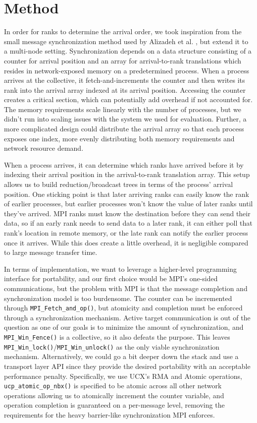 \section{Method}
In order for ranks to determine the arrival order, we took inspiration from the small message synchronization method used by Alizadeh et al. \cite{Alizadeh2022PAPCollDL}, but extend it to a multi-node setting.
Synchronization depends on a data structure consisting of a counter for arrival position and an array for arrival-to-rank translations which resides in network-exposed memory on a predetermined process.
When a process arrives at the collective, it fetch-and-increments the counter and then writes its rank into the arrival array indexed at its arrival position.
Accessing the counter creates a critical section, which can potentially add overhead if not accounted for.
The memory requirements scale linearly with the number of processes, but we didn't run into scaling issues with the system we used for evaluation.
Further, a more complicated design could distribute the arrival array so that each process exposes one index, more evenly distributing both memory requirements and network resource demand.

When a process arrives, it can determine which ranks have arrived before it by indexing their arrival position in the arrival-to-rank translation array.
This setup allows us to build reduction/broadcast trees in terms of the process' arrival position.
One sticking point is that later arriving ranks can easily know the rank of earlier processes, but earlier processes won't know the value of later ranks until they've arrived.
MPI ranks must know the destination before they can send their data, so if an early rank needs to send data to a later rank, it can either poll that rank's location in remote memory, or the late rank can notify the earlier process once it arrives.
While this does create a little overhead, it is negligible compared to large message transfer time.

In terms of implementation, we want to leverage a higher-level programming interface for portability, and our first choice would be MPI's one-sided communications, but the problem with MPI is that the message completion and synchronization model is too burdensome. 
The counter can be incremented through \texttt{MPI\_Fetch\_and\_op()}, but atomicity and completion must be enforced through a synchronization mechanism. 
Active target communication is out of the question as one of our goals is to minimize the amount of synchronization, and \texttt{MPI\_Win\_Fence()} is a collective, so it also defeats the purpose.
This leaves \texttt{MPI\_Win\_lock()}/\texttt{MPI\_Win\_unlock()} as the only viable synchronization mechanism.
Alternatively, we could go a bit deeper down the stack and use a transport layer API since they provide the desired portability with an acceptable performance penalty.
Specifically, we use UCX's RMA and Atomic operations, \texttt{ucp\_atomic\_op\_nbx()} is specified to be atomic across all other network operations allowing us to atomically increment the counter variable, and operation completion is guaranteed on a per-message level, removing the requirements for the heavy barrier-like synchronization MPI enforces.

